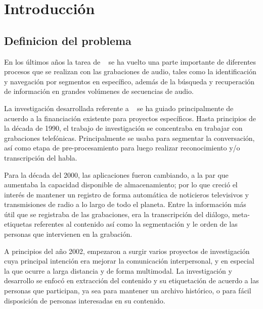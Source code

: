 
\chapter{Introducción}\label{ch:chap1}


\section{Definicion del problema} 
\label{sec:definicion}
        
En los últimos años la tarea de \SD~ se ha vuelto una parte importante de diferentes procesos que se realizan con las grabaciones de audio, tales como la identificación y navegación por segmentos en específico, además de la búsqueda y recuperación de información en grandes volúmenes de secuencias de audio.

La investigación desarrollada referente a \sd~ se ha guiado principalmente de acuerdo a la financiación existente para proyectos específicos. Hasta principios de la década de 1990, el trabajo de investigación se concentraba en trabajar con grabaciones telefónicas. Principalmente se usaba para segmentar la conversación, así como etapa de pre-procesamiento para luego realizar reconocimiento y/o transcripción del habla.

Para la década del 2000, las aplicaciones fueron cambiando, a la par que aumentaba la capacidad disponible de almacenamiento; por lo que creció el interés de mantener un registro de forma automática de noticieros televisivos  y transmisiones de radio a lo largo de todo el planeta. Entre la información más útil que se registraba de las grabaciones, era la transcripción del diálogo, meta-etiquetas referentes al contenido así como la segmentación y le orden de las personas que intervienen en la grabación.

A principios del año 2002, empezaron a surgir varios proyectos de investigación cuya principal intención era mejorar la comunicación interpersonal, y en especial la que ocurre a larga distancia y de forma multimodal. La investigación y desarrollo se enfocó en extracción del contenido y su etiquetación de acuerdo a las personas que participan, ya sea para mantener un archivo histórico, o para fácil disposición de personas interesadas en su contenido.


